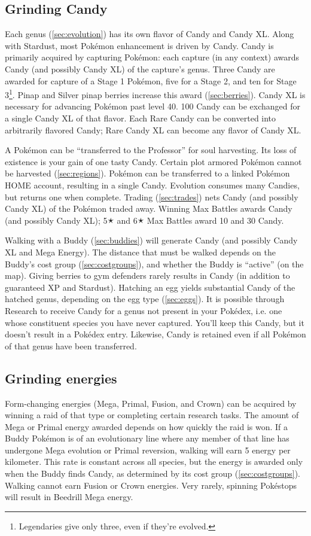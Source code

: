 \subsection{Grinding Candy\label{subsec:getcandy}}
Each genus (\autoref{sec:evolution}) has its own flavor of Candy and Candy XL\@.
Along with Stardust, most Pokémon enhancement is driven by Candy.
Candy is primarily acquired by capturing Pokémon: each capture (in any context)
  awards Candy (and possibly Candy XL) of the capture's genus.
Three Candy are awarded for capture of a Stage 1 Pokémon, five for a Stage 2,
  and ten for Stage 3\footnote{Legendaries give only three, even if they're evolved.}.
Pinap and Silver pinap berries increase this award (\autoref{sec:berries}).
Candy XL is necessary for advancing Pokémon past level 40.
100 Candy can be exchanged for a single Candy XL of that flavor.
Each Rare Candy can be converted into arbitrarily flavored Candy; Rare Candy XL can become any flavor of Candy XL\@.

A Pokémon can be ``transferred to the Professor'' for soul harvesting.
Its loss of existence is your gain of one tasty Candy.
Certain plot armored Pokémon cannot be harvested (\autoref{sec:regions}).
Pokémon can be transferred to a linked Pokémon HOME account, resulting in a single Candy.
Evolution consumes many Candies, but returns one when complete.
Trading (\autoref{sec:trades}) nets Candy (and possibly Candy XL) of the Pokémon traded away.
Winning Max Battles awards Candy (and possibly Candy XL);
 5🟉 and 6🟉 Max Battles award 10 and 30 Candy.

Walking with a Buddy (\autoref{sec:buddies}) will generate Candy (and possibly Candy XL and Mega Energy).
The distance that must be walked depends on the Buddy's cost group (\autoref{sec:costgroups}),
 and whether the Buddy is ``active'' (on the map).
Giving berries to gym defenders rarely results in Candy (in addition to guaranteed XP and Stardust).
Hatching an egg yields substantial Candy of the hatched genus, depending on the egg type (\autoref{sec:eggs}).
It is possible through Research to receive Candy for a genus not present in
  your Pokédex, i.e. one whose constituent species you have never captured.
You'll keep this Candy, but it doesn't result in a Pokédex entry.
Likewise, Candy is retained even if all Pokémon of that genus have been transferred.
\subsection{Grinding energies}
Form-changing energies (Mega, Primal, Fusion, and Crown) can be acquired by
 winning a raid of that type or completing certain research tasks.
The amount of Mega or Primal energy awarded depends on how quickly the raid is won.
If a Buddy Pokémon is of an evolutionary line where any member of that line has undergone Mega evolution
  or Primal reversion, walking will earn 5 energy per kilometer.
This rate is constant across all species, but the energy is awarded only when the Buddy finds Candy,
  as determined by its cost group (\autoref{sec:costgroups}).
Walking cannot earn Fusion or Crown energies.
Very rarely, spinning Pokéstops will result in Beedrill Mega energy.

